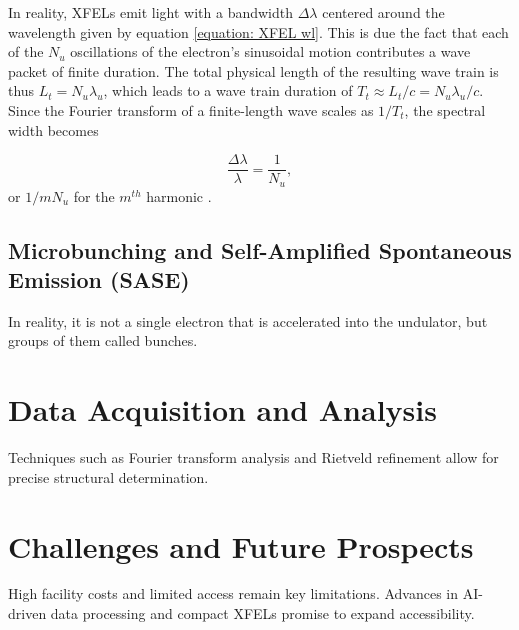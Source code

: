 \documentclass[aps,prb,twocolumn,superscriptaddress]{revtex4-2}
\begin{document}
    In reality, XFELs emit light with a bandwidth $\Delta\lambda$ centered
around the wavelength given by equation \ref{equation: XFEL wl}. This is due
the fact that each of the $N_u$ oscillations of the electron's sinusoidal motion 
contributes a wave packet of finite duration. The total physical length of the
resulting wave train is thus $L_t = N_u\lambda_u$, which leads to a wave train
duration of $T_t \approx L_t/c = N_u\lambda_u/c$. Since the Fourier transform 
of a finite-length wave scales as $1/T_t$, the spectral width becomes

\begin{equation}
    \frac{\Delta\lambda}{\lambda} = \frac{1}{N_u},
\end{equation}
or $1/mN_u$ for the $m^{th}$ harmonic \cite{CERN}.

\subsection{Microbunching and Self-Amplified Spontaneous Emission (SASE)}

In reality, it is not a single electron that is accelerated into the undulator,
but groups of them called bunches.


\newpage






\section{Data Acquisition and Analysis} \label{sec:data}
Techniques such as Fourier transform analysis and Rietveld refinement allow for precise structural determination.

\section{Challenges and Future Prospects} \label{sec:challenges}
High facility costs and limited access remain key limitations. Advances in AI-driven data processing and compact XFELs
promise to expand accessibility.



\end{document}

